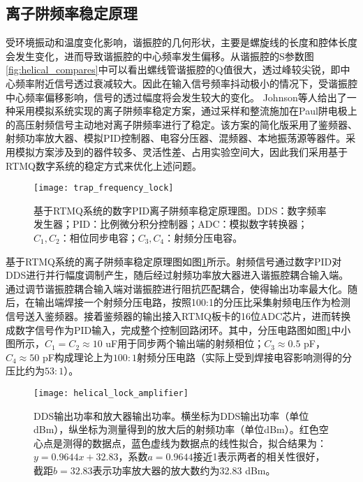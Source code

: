 \subsection[离子阱频率稳定原理和系统搭建]{离子阱频率稳定原理}


受环境振动和温度变化影响，谐振腔的几何形状，主要是螺旋线的长度和腔体长度会发生变化，进而导致谐振腔的中心频率发生偏移。从谐振腔的S参数图\ref{fig:helical_compares}中可以看出螺线管谐振腔的Q值很大，透过峰较尖锐，即中心频率附近信号透过衰减较大。因此在输入信号频率抖动极小的情况下，受谐振腔中心频率偏移影响，信号的透过幅度将会发生较大的变化。
Johnson等人\cite[]{Johnson_Wong_Campos_Restelli_Landsman_Neyenhuis_Mizrahi_Monroe_2016}给出了一种采用模拟系统实现的离子阱频率稳定方案，通过采样和整流施加在Paul阱电极上的高压射频信号主动地对离子阱频率进行了稳定。该方案的简化版采用了鉴频器、射频功率放大器、模拟PID控制器、电容分压器、混频器、本地振荡源等器件。采用模拟方案涉及到的器件较多、灵活性差、占用实验空间大，因此我们采用基于RTMQ数字系统的稳定方式来优化上述问题。

\begin{figure}
    \centering
    \texttt{[image: trap\_frequency\_lock]}
    \caption[基于RTMQ系统的数字PID离子阱频率稳定原理图]{基于RTMQ系统的数字PID离子阱频率稳定原理图。DDS：数字频率发生器；PID：比例微分积分控制器；ADC：模拟数字转换器；$C_1,C_2$：相位同步电容；$C_3,C_4$：射频分压电容。\label{fig:trap_frequency_lock}}
\end{figure}


基于RTMQ系统的离子阱频率稳定原理图如图\ref{fig:trap_frequency_lock}所示。射频信号通过数字PID对DDS进行并行幅度调制产生，随后经过射频功率放大器进入谐振腔耦合输入端。通过调节谐振腔耦合输入端对谐振腔进行阻抗匹配耦合，使得输出功率最大化。随后，在输出端焊接一个射频分压电路，按照100:1的分压比采集射频电压作为检测信号送入鉴频器。接着鉴频器的输出接入RTMQ板卡的16位ADC芯片，进而转换成数字信号作为PID输入，完成整个控制回路闭环。其中，分压电路图如图\ref{fig:trap_frequency_lock}中小图所示，$C_1=C_2\approx10$ uF用于同步两个输出端的射频相位；$C_3\approx0.5$ pF，$C_4\approx50$ pF构成理论上为$100:1$射频分压电路（实际上受到焊接电容影响测得的分压比约为$53:1$）。

\begin{figure}
    \centering
    \texttt{[image: helical\_lock\_amplifier]}
    \caption[DDS输出功率和放大器输出功率]{DDS输出功率和放大器输出功率。横坐标为DDS输出功率（单位dBm），纵坐标为测量得到的放大后的射频功率（单位dBm）。红色空心点是测得的数据点，蓝色虚线为数据点的线性拟合，拟合结果为：$y=0.9644x+32.83$，系数$a=0.9644$接近1表示两者的相关性很好，截距$b=32.83$表示功率放大器的放大数约为32.83 dBm。\label{fig:helical_lock_amplifier}}
\end{figure}


